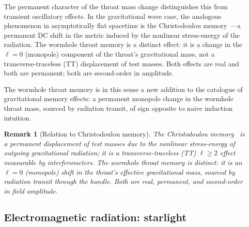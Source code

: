 \documentclass[aps,prd,onecolumn,nofootinbib,superscriptaddress]{revtex4-2}
\newtheorem{remark}{Remark}
\begin{document}
The permanent character of the throat mass change distinguishes this from
transient oscillatory effects.  In the gravitational wave case, the analogous
phenomenon in asymptotically flat spacetime is the Christodoulou
memory~\cite{Christodoulou1991Memory}---a permanent DC shift in the metric induced by the nonlinear
stress-energy of the radiation.  The wormhole throat memory is a distinct effect:
it is a change in the $\ell=0$ (monopole) component of the throat's gravitational
mass, not a transverse-traceless (TT) displacement of test masses.  Both
effects are real and both are permanent; both are second-order in amplitude.

The wormhole throat memory is in this sense a new addition to the catalogue of
gravitational memory effects: a permanent monopole change in the wormhole
throat mass, sourced by radiation transit, of sign opposite to naive induction
intuition.

\begin{remark}[Relation to Christodoulou memory]
The Christodoulou memory~\cite{Christodoulou1991Memory} is a permanent
displacement of test masses due to the nonlinear stress-energy of outgoing
gravitational radiation; it is a transverse-traceless (TT) $\ell \ge 2$
effect measurable by interferometers.  The wormhole throat memory is
distinct: it is an $\ell = 0$ (monopole) shift in the throat's effective
gravitational mass, sourced by radiation transit through the handle.  Both
are real, permanent, and second-order in field amplitude.
\end{remark}

\subsection{Electromagnetic radiation: starlight}
\end{document}
